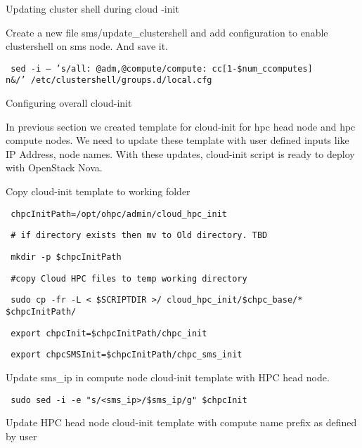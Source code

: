 \begin{section}
Updating cluster shell during cloud -init

Create a new file sms/update\_clustershell and add configuration to enable clustershell on sms node. And save it. 

\begin{bash}\texttt{\small{ sed -i -- 's/all: @adm,@compute/compute: cc[1-\${num\_ccomputes}]\\n\&/' /etc/clustershell/groups.d/local.cfg}}\end{bash}


Configuring overall cloud-init

In previous section we created template for cloud-init for hpc head node and hpc compute nodes. We need to update these template with user defined inputs like IP Address, node names. With these updates, cloud-init script is ready to deploy with OpenStack Nova.

Copy cloud-init template to working folder

\begin{bash}\texttt{\small{ chpcInitPath=/opt/ohpc/admin/cloud\_hpc\_init}}\end{bash}
\begin{bash}\texttt{\small{ \# if directory exists then mv to Old directory. TBD}}\end{bash}
\begin{bash}\texttt{\small{ mkdir -p \$chpcInitPath}}\end{bash}
\begin{bash}\texttt{\small{ \#copy Cloud HPC files to temp working directory}}\end{bash}
\begin{bash}\texttt{\small{ sudo cp -fr -L < \${SCRIPTDIR} >/ cloud\_hpc\_init/\${chpc\_base}/* \$chpcInitPath/}}\end{bash}
\begin{bash}\texttt{\small{ export chpcInit=\$chpcInitPath/chpc\_init}}\end{bash}
\begin{bash}\texttt{\small{ export chpcSMSInit=\$chpcInitPath/chpc\_sms\_init}}\end{bash}

Update sms\_ip in compute node cloud-init template with HPC head node. 

\begin{bash}\texttt{\small{ sudo sed -i -e "s/<sms\_ip>/\${sms\_ip}/g" \$chpcInit}}\end{bash}

Update HPC head node cloud-init template with compute name prefix as defined by user


\end{section}
